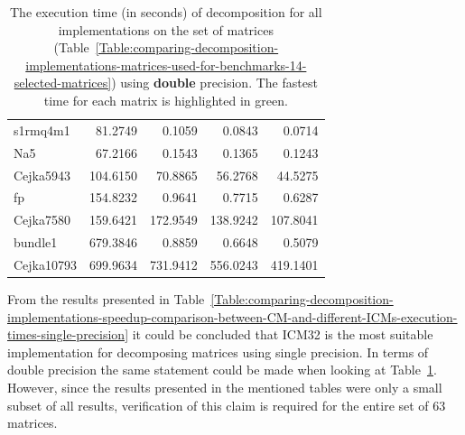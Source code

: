 \begin{table}[ht!]
\begin{tabular}{|>{\footnotesize}l|>{\raggedleft\arraybackslash\footnotesize}r|>{\raggedleft\arraybackslash\footnotesize}r|>{\raggedleft\arraybackslash\footnotesize}r|>{\raggedleft\arraybackslash\footnotesize}r|}
		s1rmq4m1        &                    81.2749 &                     0.1059 &                     0.0843 & \cellcolor{green!25}  0.0714 \\
		Na5             &                    67.2166 &                     0.1543 &                     0.1365 & \cellcolor{green!25}  0.1243 \\
		Cejka5943		&                   104.6150 &                    70.8865 &                    56.2768 & \cellcolor{green!25} 44.5275 \\
		fp              &                   154.8232 &                     0.9641 &                     0.7715 & \cellcolor{green!25}  0.6287 \\
		Cejka7580		&                   159.6421 &                   172.9549 &                   138.9242 & \cellcolor{green!25}107.8041 \\
		bundle1         &                   679.3846 &                     0.8859 &                     0.6648 & \cellcolor{green!25}  0.5079 \\
		Cejka10793      &                   699.9634 &                   731.9412 &                   556.0243 & \cellcolor{green!25}419.1401 \\ \hline
	\end{tabular}
	\caption{The execution time (in seconds) of decomposition for all implementations on the set of matrices (Table~\ref{Table:comparing-decomposition-implementations-matrices-used-for-benchmarks-14-selected-matrices}) using \textbf{double} precision. The fastest time for each matrix is highlighted in green.}
	\label{Table:comparing-decomposition-implementations-speedup-comparison-between-CM-and-different-ICMs-execution-times-double-precision}
\end{table}

From the results presented in Table~\ref{Table:comparing-decomposition-implementations-speedup-comparison-between-CM-and-different-ICMs-execution-times-single-precision} it could be concluded that ICM32 is the most suitable implementation for decomposing matrices using single precision. In terms of double precision the same statement could be made when looking at Table~\ref{Table:comparing-decomposition-implementations-speedup-comparison-between-CM-and-different-ICMs-execution-times-double-precision}. However, since the results presented in the mentioned tables were only a small subset of all results, verification of this claim is required for the entire set of 63 matrices.

